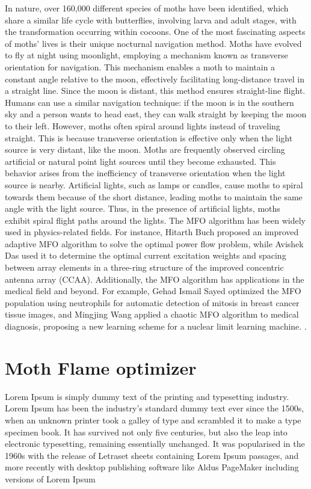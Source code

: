 \documentclass[conference]{IEEEtran}
\begin{document}
In nature, over 160,000 different species of moths have been identified, which share a similar life cycle with butterflies, involving larva and adult stages, with the transformation occurring within cocoons. One of the most fascinating aspects of moths’ lives is their unique nocturnal navigation method. Moths have evolved to fly at night using moonlight, employing a mechanism known as transverse orientation for navigation. This mechanism enables a moth to maintain a constant angle relative to the moon, effectively facilitating long-distance travel in a straight line. Since the moon is distant, this method ensures straight-line flight. Humans can use a similar navigation technique: if the moon is in the southern sky and a person wants to head east, they can walk straight by keeping the moon to their left. However, moths often spiral around lights instead of traveling straight. This is because transverse orientation is effective only when the light source is very distant, like the moon. Moths are frequently observed circling artificial or natural point light sources until they become exhausted. This behavior arises from the inefficiency of transverse orientation when the light source is nearby. Artificial lights, such as lamps or candles, cause moths to spiral towards them because of the short distance, leading moths to maintain the same angle with the light source. Thus, in the presence of artificial lights, moths exhibit spiral flight paths around the lights.
The MFO algorithm has been widely used in physics-related fields. For instance, Hitarth Buch proposed an improved adaptive MFO algorithm to solve the optimal power flow problem, while Avishek Das used it to determine the optimal current excitation weights and spacing between array elements in a three-ring structure of the improved concentric antenna array (CCAA). Additionally, the MFO algorithm has applications in the medical field and beyond. For example, Gehad Ismail Sayed optimized the MFO population using neutrophils for automatic detection of mitosis in breast cancer tissue images, and Mingjing Wang applied a chaotic MFO algorithm to medical diagnosis, proposing a new learning scheme for a nuclear limit learning machine.
.
\section{Moth Flame optimizer}
Lorem Ipsum is simply dummy text of the printing and typesetting industry. Lorem Ipsum has been the industry's standard dummy text ever since the 1500s, when an unknown printer took a galley of type and scrambled it to make a type specimen book. It has survived not only five centuries, but also the leap into electronic typesetting, remaining essentially unchanged. It was popularised in the 1960s with the release of Letraset sheets containing Lorem Ipsum passages, and more recently with desktop publishing software like Aldus PageMaker including versions of Lorem Ipsum	
\end{document}
